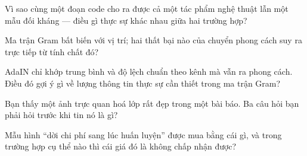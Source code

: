 \documentclass[../../../deep_learning.tex]{subfiles}
\begin{document}
\begin{tukiem}
\item Vì sao cùng một đoạn code cho ra được cả một tác phẩm nghệ thuật lẫn một mẫu đối kháng --- điều gì thực sự khác nhau giữa hai trường hợp?
\item Ma trận Gram bất biến với vị trí; hai thất bại nào của chuyển phong cách suy ra trực tiếp từ tính chất đó?
\item AdaIN chỉ khớp trung bình và độ lệch chuẩn theo kênh mà vẫn ra phong cách. Điều đó gợi ý gì về lượng thông tin thực sự cần thiết trong ma trận Gram?
\item Bạn thấy một ảnh trực quan hoá lớp rất đẹp trong một bài báo. Ba câu hỏi bạn phải hỏi trước khi tin nó là gì?
\item Mẫu hình ``dời chi phí sang lúc huấn luyện'' được mua bằng cái gì, và trong trường hợp cụ thể nào thì cái giá đó là không chấp nhận được?
\end{tukiem}
\ifSubfilesClassLoaded{\printbibliography[title={Nguồn}]}{}
\end{document}
